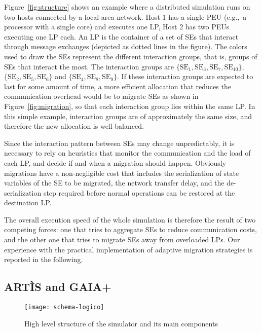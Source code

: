 \documentclass[1p]{elsarticle}
\begin{document}
Figure~\ref{fig:structure} shows an example where a distributed
simulation runs on two hosts connected by a local area network. Host 1
has a single PEU (e.g.,~a processor with a single core) and executes
one LP, Host 2 has two PEUs executing one LP each. An LP is the
container of a set of SEs that interact through message exchanges
(depicted as dotted lines in the figure).  The colors used to draw the
SEs represent the different interaction groups, that is, groups of SEs
that interact the most.  The interaction groups are $\{\mathrm{SE}_1,
\mathrm{SE}_3, \mathrm{SE}_7, \mathrm{SE}_{10}\}$, $\{\mathrm{SE}_2,
\mathrm{SE}_5, \mathrm{SE}_6\}$ and $\{\mathrm{SE}_4, \mathrm{SE}_8,
\mathrm{SE}_9\}$.  If these interaction groups are expected to last
for some amount of time, a more efficient allocation that reduces the
communication overhead would be to migrate SEs as shown in
Figure~\ref{fig:migration}, so that each interaction group lies within
the same LP. In this simple example, interaction groups are of
approximately the same size, and therefore the new allocation is well
balanced.

Since the interaction pattern between SEs may change unpredictably, it
is necessary to rely on heuristics that monitor the communication and
the load of each LP, and decide if and when a migration should
happen. Obviously migrations have a non-negligible cost that includes
the serialization of state variables of the SE to be migrated, the
network transfer delay, and the de-serialization step required before
normal operations can be restored at the destination LP.

The overall execution speed of the whole simulation is therefore the
result of two competing forces: one that tries to aggregate SEs to
reduce communication costs, and the other one that tries to migrate
SEs away from overloaded LPs. Our experience with the practical
implementation of adaptive migration strategies is reported in the
following.

\subsection{ART\`IS and GAIA+}

\begin{figure}[ht]
\centering
\texttt{[image: schema-logico]}
\caption{High level structure of the simulator and its main components}
\label{fig_logicscheme}
\end{figure}
\end{document}
